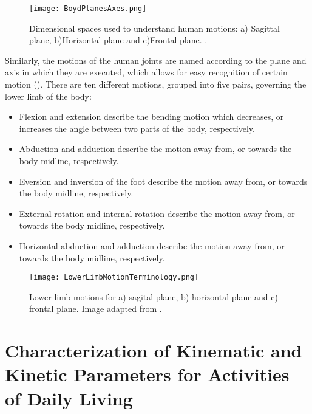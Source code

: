 \begin{figure}[htbp!]
    \centering
    \texttt{[image: BoydPlanesAxes.png]}
    \caption{Dimensional spaces used to understand human motions: a) Sagittal plane, b)Horizontal plane and c)Frontal plane. \cite{PhysicalSolutions2016}. }
    \label{fig:body_planes_axes}
\end{figure}

Similarly, the motions of the human joints are named according to the plane and axis in which they are executed, which allows for easy recognition of certain motion (). There are ten different motions, grouped into five pairs, governing the lower limb of the body:
\begin{itemize}
    \item Flexion and extension describe the bending motion which decreases, or increases the angle between two parts of the body, respectively.
    \item Abduction and adduction describe the motion away from, or towards the body midline, respectively.
    \item Eversion and inversion of the foot describe the motion away from, or towards the body midline, respectively.
    \item External rotation and internal rotation describe the motion away from, or towards the body midline, respectively.
    \item Horizontal abduction and adduction describe the motion away from, or towards the body midline, respectively.
\end{itemize}

\begin{figure}[htbp!]
    \centering
    \texttt{[image: LowerLimbMotionTerminology.png]}
    \caption{Lower limb motions for a) sagital plane, b) horizontal plane and c) frontal plane. Image adapted from  \cite{PhysicalSolutions2016}. }
    \label{fig:lower_motion}
\end{figure}

\section{Characterization of Kinematic and Kinetic Parameters for Activities of Daily Living}
\label{sec:characterizationKKP}


